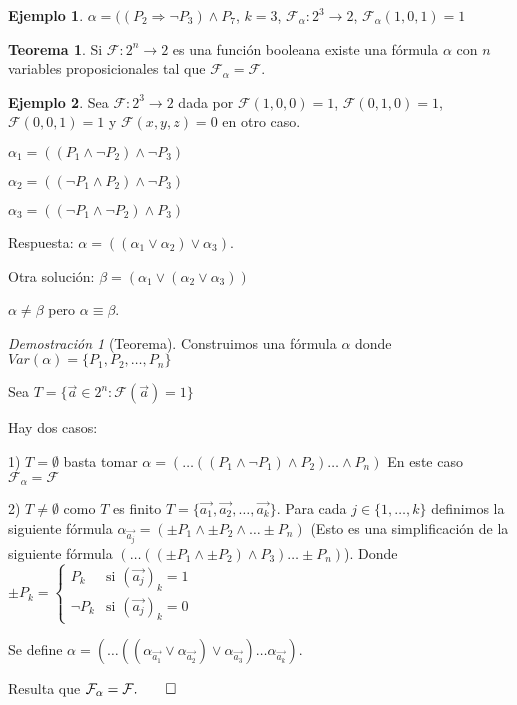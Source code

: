 \documentclass[a4paper,11pt]{article}
\theoremstyle{definition}
\newtheorem{exap}{Ejemplo}[section]
\newtheorem{teor}{Teorema}[section]
\theoremstyle{remark}
\newtheorem*{demo}{Demostración}
\def\FF{\mathcal{F}}
\def\FFa{\mathcal{F}_{\alpha}}
\begin{document}
\begin{exap}
$\alpha = ((P_2 \Rightarrow \neg P_3) \wedge P_7$, $k = 3$, $\FFa : 2^3 \to 2$,
$\FFa(1, 0, 1) = 1$
\end{exap}

\begin{teor}
Si $\FF : 2^n \to 2$ es una función booleana existe una fórmula $\alpha$ con $n$ variables 
proposicionales tal que $\FFa = \FF$.
\end{teor}

\begin{exap}
Sea $\FF : 2^3 \to 2$ dada por $\FF(1, 0, 0) = 1$, $\FF(0, 1, 0) = 1$, $\FF(0, 0, 1) = 1$ y 
$\FF(x, y, z) = 0$ en otro caso.

$\alpha_1 = ((P_1 \wedge \neg P_2) \wedge \neg P_3)$

$\alpha_2 = ((\neg P_1 \wedge P_2) \wedge \neg P_3)$

$\alpha_3 = ((\neg P_1 \wedge \neg P_2) \wedge P_3)$

Respuesta: $\alpha = ((\alpha_1 \vee \alpha_2) \vee \alpha_3)$.

Otra solución: $\beta = (\alpha_1 \vee (\alpha_2 \vee \alpha_3))$

$\alpha \neq \beta$ pero $\alpha \equiv \beta$.
\end{exap}

\begin{demo}[Teorema]
Construimos una fórmula $\alpha$ donde $Var(\alpha) = \{P_1, P_2, \dots, P_n\}$

Sea $T = \{\vec{a} \in 2^n : \FF(\vec{a}) = 1 \}$

Hay dos casos:

1) $T = \emptyset$ basta tomar $\alpha = (\dots ((P_1 \wedge \neg P_1) \wedge P_2 ) \dots \wedge P_n)$
En este caso $\FFa = \FF$

2) $T \neq \emptyset$ como $T$ es finito $T = \{\vec{a_1}, \vec{a_2}, \dots, \vec{a_k}\}$. 
Para cada $j \in \{1, \dots, k\}$ definimos la siguiente fórmula 
$\alpha_{\vec{a_j}} = (\pm P_1 \wedge \pm P_2 \wedge \dots \pm P_n)$ (Esto es
una simplificación de la siguiente fórmula 
$(\dots ((\pm P_1 \wedge \pm P_2) \wedge P_3) \dots \pm P_n)$).
Donde $\pm P_k = \begin{cases}
                  P_k & \text{si }(\vec{a_j})_k = 1 \\
                  \neg P_k & \text{si }(\vec{a_j})_k = 0
                 \end{cases}
$

Se define $\alpha = (\dots ((\alpha_{\vec{a_1}} \vee \alpha_{\vec{a_2}}) 
\vee \alpha_{\vec{a_3}})\dots \alpha_{\vec{a_k}})$.

Resulta que $\FFa = \FF. \qed$
\end{demo}
\end{document}
